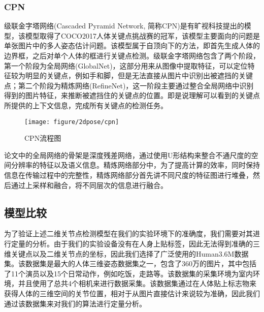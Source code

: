 \subsubsection{CPN}
级联金字塔网络(Cascaded Pyramid Network, 简称CPN)是有旷视科技提出的模型，该模型取得了COCO2017人体关键点挑战赛的冠军，该模型主要面向的问题是单张图片中的多人姿态估计问题。该模型属于自顶向下的方法，即首先生成人体的边界框，之后对单个人体的框进行关键点检测。级联金字塔网络包含了两个阶段，第一个阶段为全局网络(GlobalNet)，这部分用来从图像中提取特征，可以定位特征较为明显的关键点，例如手和脚，但是无法直接从图片中识别出被遮挡的关键点；第二个阶段为精炼网络(RefineNet)，这一阶段主要通过整合全局网络中识别得到的图片特征，来推断被遮挡住的关键点的位置。即是说理解可以看到的关键点所提供的上下文信息，完成所有关键点的检测任务。
\begin{figure}[H]
    \centering
    \texttt{[image: figure/2dpose/cpn]}
    \caption{\label{fig:2d-cpn} CPN流程图}
\end{figure}
论文中的全局网络的骨架是深度残差网络\cite{resnet}，通过使用U形结构来整合不通尺度的空间分辨率的特征以及语义信息。精炼网络部分中，为了提高计算的效率，同时保持信息在传输过程中的完整性，精炼网络部分首先讲不同尺度的特征图进行堆叠，然后通过上采样和融合，将不同层次的信息进行融合。

\subsection{模型比较}
为了验证上述二维关节点检测模型在我们的实验环境下的准确度，我们需要对其进行定量的分析。由于我们的实验设备没有在人身上贴标签，因此无法得到准确的三维关键点以及二维关节点的坐标，因此我们选择了广泛使用的Human3.6M数据集。该数据集是最大的人体三维姿态数据集之一，包含了360万的图片，其中包括了11个演员以及15个日常动作，例如吃饭，走路等。该数据集的采集环境为室内环境，并且使用了总共4个相机来进行数据采集。该数据集通过在人体贴上标志物来获得人体的三维空间的关节位置，相对于从图片直接估计来说较为准确，因此我们通过该数据集来对我们的算法进行定量分析。

